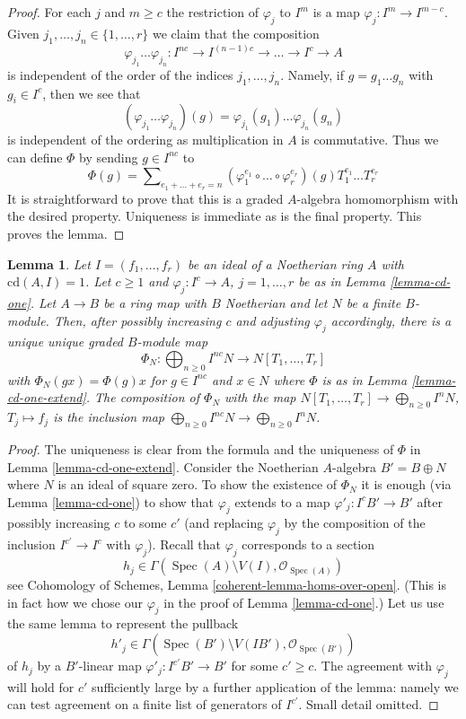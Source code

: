 \documentclass{stacks-project}
\theoremstyle{plain}
\newtheorem{lemma}[subsection]{Lemma}
\theoremstyle{definition}
\theoremstyle{remark}
\numberwithin{equation}{subsection}
\def\Spec{\mathop{\mathrm{Spec}}}
\begin{document}
\begin{proof}
For each $j$ and $m \geq c$ the restriction of $\varphi_j$ to
$I^m$ is a map $\varphi_j : I^m \to I^{m - c}$.
Given $j_1, \ldots, j_n \in \{1, \ldots, r\}$ we claim that the
composition
$$
\varphi_{j_1} \ldots \varphi_{j_n} :
I^{nc} \to I^{(n - 1)c} \to \ldots \to I^c \to A
$$
is independent of the order of the indices $j_1, \ldots, j_n$.
Namely, if $g = g_1 \ldots g_n$ with $g_i \in I^c$, then
we see that
$$
(\varphi_{j_1} \ldots \varphi_{j_n})(g) =
\varphi_{j_1}(g_1) \ldots \varphi_{j_n}(g_n)
$$
is independent of the ordering as multiplication in $A$ is commutative.
Thus we can define $\Phi$ by sending $g \in I^{nc}$ to
$$
\Phi(g) = \sum\nolimits_{e_1 + \ldots + e_r = n}
(\varphi_1^{e_1} \circ \ldots \circ \varphi_r^{e_r})(g)
T_1^{e_1} \ldots T_r^{e_r}
$$
It is straightforward to prove that this is a graded $A$-algebra
homomorphism with the desired property. Uniqueness is immediate
as is the final property. This proves the lemma.
\end{proof}

\begin{lemma}
\label{lemma-cd-one-extend-to-module}
Let $I = (f_1, \ldots, f_r)$ be an ideal of a Noetherian ring $A$
with $\text{cd}(A, I) = 1$. Let $c \geq 1$ and $\varphi_j : I^c \to A$,
$j = 1, \ldots, r$ be as in Lemma \ref{lemma-cd-one}.
Let $A \to B$ be a ring map with $B$ Noetherian and let $N$ be
a finite $B$-module. Then, after possibly increasing $c$
and adjusting $\varphi_j$ accordingly, there is a unique
unique graded $B$-module map
$$
\Phi_N : \bigoplus\nolimits_{n \geq 0} I^{nc}N \to N[T_1, \ldots, T_r]
$$
with $\Phi_N(g x) = \Phi(g) x$ for $g \in I^{nc}$ and $x \in N$
where $\Phi$ is as in Lemma \ref{lemma-cd-one-extend}.
The composition of $\Phi_N$ with the map
$N[T_1, \ldots, T_r] \to \bigoplus_{n \geq 0} I^nN$,
$T_j \mapsto f_j$ is the inclusion map
$\bigoplus_{n \geq 0} I^{nc}N \to \bigoplus_{n \geq 0} I^nN$.
\end{lemma}

\begin{proof}
The uniqueness is clear from the formula and the uniqueness of $\Phi$ in
Lemma \ref{lemma-cd-one-extend}. Consider the Noetherian $A$-algebra
$B' = B \oplus N$ where $N$ is an ideal of square zero. To show
the existence of $\Phi_N$ it is enough
(via Lemma \ref{lemma-cd-one}) to show that $\varphi_j$ extends to
a map $\varphi'_j : I^cB' \to B'$ after possibly increasing $c$
to some $c'$ (and replacing $\varphi_j$ by the composition of the inclusion
$I^{c'} \to I^c$ with $\varphi_j$). Recall that $\varphi_j$ corresponds to a
section
$$
h_j \in \Gamma(\Spec(A) \setminus V(I), \mathcal{O}_{\Spec(A)})
$$
see Cohomology of Schemes, Lemma \ref{coherent-lemma-homs-over-open}.
(This is in fact how we chose our $\varphi_j$ in the proof of
Lemma \ref{lemma-cd-one}.) Let us use the same lemma to represent the pullback
$$
h'_j \in \Gamma(\Spec(B') \setminus V(IB'), \mathcal{O}_{\Spec(B')})
$$
of $h_j$ by a $B'$-linear map
$\varphi'_j : I^{c'}B' \to B'$ for some $c' \geq c$.
The agreement with $\varphi_j$ will hold for $c'$
sufficiently large by a further application of the lemma:
namely we can test agreement on a finite list of generators of $I^{c'}$.
Small detail omitted.
\end{proof}
\end{document}
